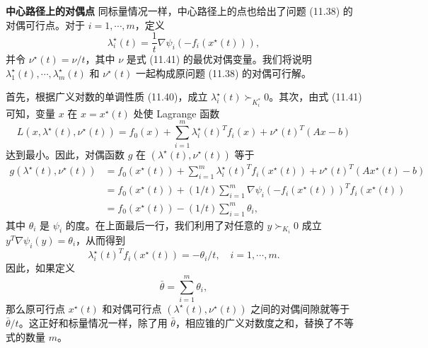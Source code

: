 \documentclass[UTF8,12pt,a4paper,fontset=fandol]{ctexart}
\begin{document}
\noindent\textbf{中心路径上的对偶点}\quad
同标量情况一样，中心路径上的点也给出了问题 (11.38) 的对偶可行点。对于 $i=1,\cdots,m$，定义
\begin{equation}
\lambda_i^\star(t)=\frac{1}{t}\nabla\psi_i(-f_i(x^\star(t))),
\tag{11.42}
\end{equation}
并令 $\nu^\star(t)=\nu/t$，其中 $\nu$ 是式 (11.41) 的最优对偶变量。我们将说明 $\lambda_1^\star(t),\cdots,\lambda_m^\star(t)$ 和 $\nu^\star(t)$ 一起构成原问题 (11.38) 的对偶可行解。

首先，根据广义对数的单调性质 (11.40)，成立 $\lambda_i^\star(t)\succ_{K_i^\ast}0$。其次，由式 (11.41) 可知，变量 $x$ 在 $x=x^\star(t)$ 处使 Lagrange 函数
\[
L(x,\lambda^\star(t),\nu^\star(t))=f_0(x)+\sum_{i=1}^m\lambda_i^\star(t)^Tf_i(x)+\nu^\star(t)^T(Ax-b)
\]
达到最小。因此，对偶函数 $g$ 在 $(\lambda^\star(t),\nu^\star(t))$ 等于
\[
\begin{aligned}
g(\lambda^\star(t),\nu^\star(t))
&=f_0(x^\star(t))+\sum_{i=1}^m\lambda_i^\star(t)^Tf_i(x^\star(t))+\nu^\star(t)^T(Ax^\star(t)-b)\\
&=f_0(x^\star(t))+(1/t)\sum_{i=1}^m\nabla\psi_i(-f_i(x^\star(t)))^Tf_i(x^\star(t))\\
&=f_0(x^\star(t))-(1/t)\sum_{i=1}^m\theta_i,
\end{aligned}
\]
其中 $\theta_i$ 是 $\psi_i$ 的度。在上面最后一行，我们利用了对任意的 $y\succ_{K_i}0$ 成立 $y^T\nabla\psi_i(y)=\theta_i$，从而得到
\begin{equation}
\lambda_i^\star(t)^Tf_i(x^\star(t))=-\theta_i/t,\quad i=1,\cdots,m.
\tag{11.43}
\end{equation}
因此，如果定义
\[
\bar{\theta}=\sum_{i=1}^m\theta_i,
\]
那么原可行点 $x^\star(t)$ 和对偶可行点 $(\lambda^\star(t),\nu^\star(t))$ 之间的对偶间隙就等于 $\bar{\theta}/t$。这正好和标量情况一样，除了用 $\bar{\theta}$，相应锥的广义对数度之和，替换了不等式的数量 $m$。
\end{document}
